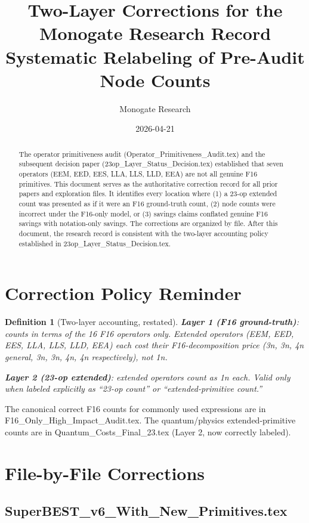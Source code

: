 \documentclass[11pt]{article}
\title{Two-Layer Corrections for the Monogate Research Record\\
Systematic Relabeling of Pre-Audit Node Counts}
\author{Monogate Research}
\date{2026-04-21}
\newtheorem{definition}[theorem]{Definition}
\begin{document}
\maketitle

\begin{abstract}
The operator primitiveness audit (Operator\_Primitiveness\_Audit.tex) and
the subsequent decision paper (23op\_Layer\_Status\_Decision.tex) established
that seven operators (EEM, EED, EES, LLA, LLS, LLD, EEA) are not all genuine
F16 primitives.
This document serves as the authoritative correction record for all prior
papers and exploration files.
It identifies every location where (1) a 23-op extended count was presented
as if it were an F16 ground-truth count, (2) node counts were incorrect
under the F16-only model, or (3) savings claims conflated genuine F16 savings
with notation-only savings.
The corrections are organized by file.
After this document, the research record is consistent with the two-layer
accounting policy established in 23op\_Layer\_Status\_Decision.tex.
\end{abstract}

\section{Correction Policy Reminder}

\begin{definition}[Two-layer accounting, restated]
\textbf{Layer 1 (F16 ground-truth)}: counts in terms of the 16 F16 operators only.
Extended operators (EEM, EED, EES, LLA, LLS, LLD, EEA) each cost their F16-decomposition
price (3n, 3n, 4n general, 3n, 3n, 4n, 4n respectively), not 1n.

\textbf{Layer 2 (23-op extended)}: extended operators count as 1n each.
Valid only when labeled explicitly as ``23-op count'' or ``extended-primitive count.''
\end{definition}

The canonical correct F16 counts for commonly used expressions are in
F16\_Only\_High\_Impact\_Audit.tex.
The quantum/physics extended-primitive counts are in
Quantum\_Costs\_Final\_23.tex (Layer 2, now correctly labeled).

\section{File-by-File Corrections}

\subsection{SuperBEST\_v6\_With\_New\_Primitives.tex}
\end{document}
